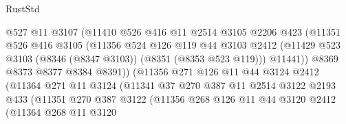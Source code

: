 \begin{lexlean}{RustStd}
\begin{coremodule}
                            @527
                            @11
                            @3107
                            (@11410
                              @526
                              @416
                              @11
                              @2514
                              @3105
                              @2206
                              @423
                              (@11351
                                @526
                                @416
                                @3105
                                (@11356
                                  @524
                                  @126
                                  @119
                                  @44
                                  @3103
                                  @2412
                                  (@11429
                                    @523
                                    @3103
                                    (@8346 (@8347 @3103))
                                    (@8351 (@8353 @523 @119)))
                                  @11441))
                              @8369
                              @8373
                              @8377
                              @8384
                              @8391))
                          (@11356
                            @271
                            @126
                            @11
                            @44
                            @3124
                            @2412
                            (@11364
                              @271
                              @11
                              @3124
                              (@11341
                                @37
                                @270
                                @387
                                @11
                                @2514
                                @3122
                                @2193
                                @433
                                (@11351
                                  @270
                                  @387
                                  @3122
                                  (@11356
                                    @268
                                    @126
                                    @11
                                    @44
                                    @3120
                                    @2412
                                    (@11364
                                      @268
                                      @11
                                      @3120

\end{coremodule}
\end{lexlean}
